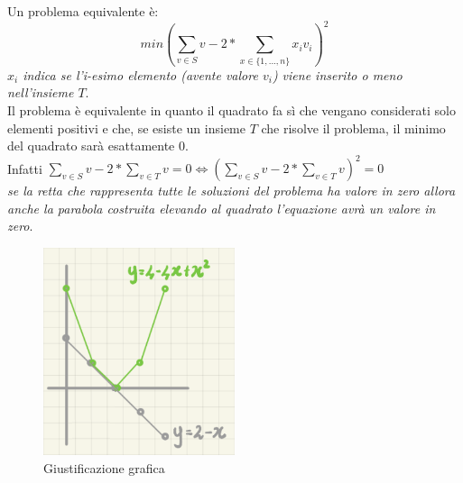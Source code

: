 \documentclass[a4paper]{article}
\begin{document}
Un problema equivalente è: $$ min(\sum_{v\in S} v - 2 * \sum_{x \in \{1,...,n\}} x_iv_i)^2$$ \textit{$x_i$ indica se l'i-esimo elemento (avente valore $v_i$) viene inserito o meno nell'insieme $T$}.\\
Il problema è equivalente in quanto il quadrato fa sì che vengano considerati solo elementi positivi e che, se esiste un insieme $T$ che risolve il problema, il minimo del quadrato sarà esattamente 0.\\
Infatti $\sum_{v\in S} v - 2 * \sum_{v\in T} v = 0 \Leftrightarrow (\sum_{v\in S} v - 2 * \sum_{v\in T} v)^2=0$\\
\textit{se la retta che rappresenta tutte le soluzioni del problema ha valore in zero allora anche la parabola costruita elevando al quadrato l'equazione avrà un valore in zero}.
\begin{figure}[!ht]
                \centering
                \includegraphics[width = 0.5\textwidth]{./img/F1.png}
                \caption{Giustificazione grafica} \label{FIG:F1}
\end{figure}
\end{document}
